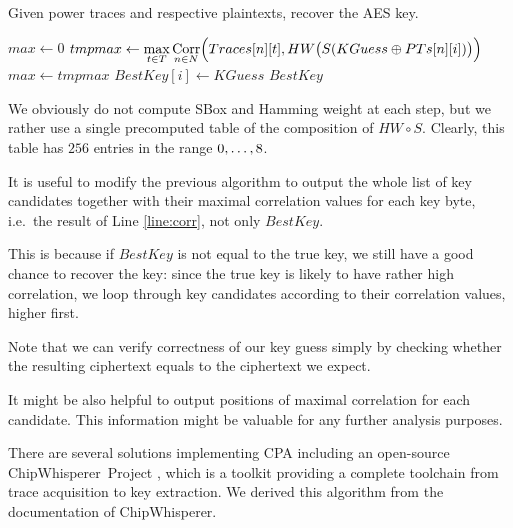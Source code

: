 	\begin{alg}
	\label{alg:cpa}
	Given power traces and respective plaintexts, recover the AES key.
		\begin{algorithmic}[1]
					\State $max \gets 0$
						\State $tmpmax \gets \max\limits_{t\in T} \operatorname*{Corr}\limits_{n\in N}\Bigl(Traces[n][t], HW\bigl(S(KGuess\oplus PTs[n][i])\bigr)\Bigr)$
							\label{line:corr}
							\State $max \gets tmpmax$
							\State $BestKey[i] \gets KGuess$
						\EndIf
					\EndFor
				\EndFor
				\State\Return $BestKey$
			\EndFunction
		\end{algorithmic}
	\end{alg}
	
	\begin{remark}
	\label{rem:attacklookup}
		We obviously do not compute SBox and Hamming weight at each step, but we rather use a single precomputed table of the composition of $HW\circ S$. Clearly, this table has $256$ entries in the range $0 , \ldots , 8$.
	\end{remark}
	
	\begin{note}
	\label{note:fulllist}
		It is useful to modify the previous algorithm to output the whole list of key candidates together with their maximal correlation values for each key byte, i.e.\ the result of Line \ref{line:corr}, not only $BestKey$.
		
		This is because if $BestKey$ is not equal to the true key, we still have a good chance to recover the key: since the true key is likely to have rather high correlation, we loop through key candidates according to their correlation values, higher first.
		
		Note that we can verify correctness of our key guess simply by checking whether the resulting ciphertext equals to the ciphertext we expect.
	\end{note}
	
	\begin{note}
	\label{note:leakpos}
		It might be also helpful to output positions of maximal correlation for each candidate. This information might be valuable for any further analysis purposes.
	\end{note}
	
	There are several solutions implementing CPA including an open-source ChipWhisperer\texttrademark\ Project \cite{chipwhisperer}, which is a toolkit providing a complete toolchain from trace acquisition to key extraction. We derived this algorithm from the documentation of ChipWhisperer\texttrademark.


